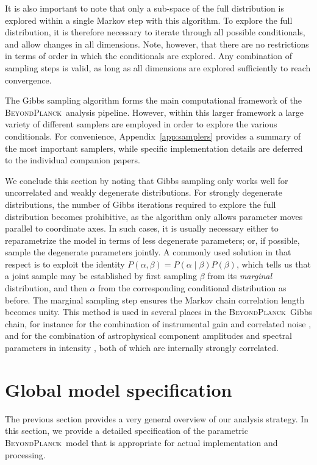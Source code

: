 \documentclass[twocolumn]{aa}
\newcommand{\BP}{\textsc{BeyondPlanck}}
\begin{document}
It is also important to note that only a sub-space of the full
distribution is explored within a single Markov step with this
algorithm. To explore the full distribution, it is therefore necessary
to iterate through all possible conditionals, and allow changes in all
dimensions. Note, however, that there are no restrictions in terms of
order in which the conditionals are explored. Any combination of
sampling steps is valid, as long as all dimensions are explored
sufficiently to reach convergence.

The Gibbs sampling algorithm forms the main computational framework of
the \BP\ analysis pipeline. However, within this larger framework a
large variety of different samplers are employed in order to explore
the various conditionals. For convenience, Appendix~\ref{app:samplers}
provides a summary of the most important samplers, while specific
implementation details are deferred to the individual companion
papers.

We conclude this section by noting that Gibbs sampling only works well
for uncorrelated and weakly degenerate distributions. For strongly
degenerate distributions, the number of Gibbs iterations required to
explore the full distribution becomes prohibitive, as the algorithm
only allows parameter moves parallel to coordinate axes. In such
cases, it is usually necessary either to reparametrize the model in
terms of less degenerate parameters; or, if possible, sample the
degenerate parameters jointly. A commonly used solution in that respect
is to exploit the identity $P(\alpha,\beta) = P(\alpha\mid
\beta)P(\beta)$, which tells us that a joint sample may be established
by first sampling $\beta$ from its \emph{marginal} distribution, and
then $\alpha$ from the corresponding conditional distribution as
before. The marginal sampling step ensures the Markov chain
correlation length becomes unity. This method is used in several places
in the \BP\ Gibbs chain, for instance for the combination of
instrumental gain and correlated noise \citep{bp07}, and for the
combination of astrophysical component amplitudes and spectral
parameters in intensity \citep{bp13}, both of which are internally
strongly correlated.


\section{Global model specification}
\label{sec:model}

The previous section provides a very general overview of our analysis
strategy. In this section, we provide a detailed specification of the
parametric \BP\ model that is appropriate for actual implementation
and processing.
\end{document}
